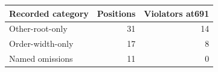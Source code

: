 \begin{tabular}{lrr}\toprule
Recorded category & Positions & Violators at691\\\midrule
Other-root-only & 31 & 14\\
Order-width-only & 17 & 8\\
Named omissions & 11 & 0\\
\bottomrule\end{tabular}
